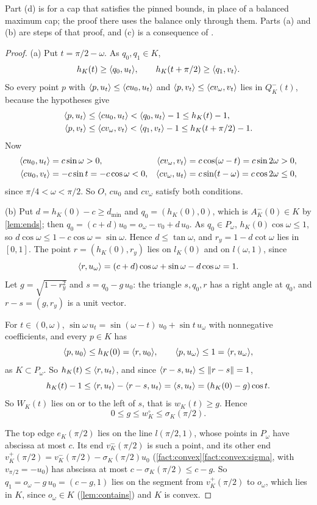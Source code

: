 Part (d) is  for a cap that satisfies the pinned bounds, in
place of a balanced maximum cap; the proof there uses the balance only through
them. Parts (a) and (b) are steps of that proof, and (c) is a consequence of
.

\begin{proof}
(a) Put $t=\pi/2-\omega$. As $q_0,q_1\in K$,
\[
  h_K(t)\ge\langle q_0,u_t\rangle,\qquad h_K(t+\pi/2)\ge\langle q_1,v_t\rangle.
\]
So every point $p$ with $\langle p,u_t\rangle\le\langle cu_0,u_t\rangle$ and $\langle p,v_t\rangle\le\langle cv_\omega,v_t\rangle$ lies in $Q^-_K(t)$, because the hypotheses give
\begin{align*}
  \langle p,u_t\rangle&\le\langle cu_0,u_t\rangle<\langle q_0,u_t\rangle-1\le h_K(t)-1,\\
  \langle p,v_t\rangle&\le\langle cv_\omega,v_t\rangle<\langle q_1,v_t\rangle-1\le h_K(t+\pi/2)-1.
\end{align*}
Now
\begin{align*}
  \langle cu_0,u_t\rangle&=c\sin\omega>0, &
    \langle cv_\omega,v_t\rangle&=c\cos(\omega-t)=c\sin2\omega>0,\\
  \langle cu_0,v_t\rangle&=-c\sin t=-c\cos\omega<0, &
    \langle cv_\omega,u_t\rangle&=c\sin(t-\omega)=c\cos2\omega\le0,
\end{align*}
since $\pi/4<\omega<\pi/2$. So $O$, $cu_0$ and $cv_\omega$ satisfy both
conditions.

(b) Put $d=h_K(0)-c\ge d_{\min}$ and $q_0=(h_K(0),0)$, which is $A^-_K(0)\in K$
by \cref{lem:ends}; then $q_0=(c+d)u_0=o_\omega-v_0+d\,u_0$. As $q_0\in
P_\omega$, $h_K(0)\cos\omega\le1$, so $d\cos\omega\le1-c\cos\omega=\sin\omega$.
Hence $d\le\tan\omega$, and $r_y=1-d\cot\omega$ lies in $[0,1]$. The point
$r=(h_K(0),r_y)$ lies on $l_K(0)$ and on $l(\omega,1)$, since
\[
  \langle r,u_\omega\rangle=(c+d)\cos\omega+\sin\omega-d\cos\omega=1.
\]
Let $g=\sqrt{1-r_y^2}$ and $s=q_0-g\,u_0$: the triangle $s,q_0,r$ has a right
angle at $q_0$, and $r-s=(g,r_y)$ is a unit vector.

For $t\in(0,\omega)$, $\sin\omega\,u_t=\sin(\omega-t)\,u_0+\sin t\,u_\omega$
with nonnegative coefficients, and every $p\in K$ has
\[
  \langle p,u_0\rangle\le h_K(0)=\langle r,u_0\rangle,\qquad\langle p,u_\omega\rangle\le1=\langle r,u_\omega\rangle,
\]
as $K\subset P_\omega$. So $h_K(t)\le\langle r,u_t\rangle$, and since
$\langle r-s,u_t\rangle\le\lVert r-s\rVert=1$,
\[
  h_K(t)-1\le\langle r,u_t\rangle-\langle r-s,u_t\rangle=\langle s,u_t\rangle=(h_K(0)-g)\cos t .
\]
So $W_K(t)$ lies on or to the left of $s$, that is $w_K(t)\ge g$. Hence
\[
  0\le g\le w^\circ_K\le\sigma_K(\pi/2).
\]

The top edge $e_K(\pi/2)$ lies on the line $l(\pi/2,1)$, whose points in
$P_\omega$ have abscissa at most $c$. Its end $v^-_K(\pi/2)$ is such a point,
and its other end $v^+_K(\pi/2)=v^-_K(\pi/2)-\sigma_K(\pi/2)u_0$
(\cref{fact:convex}\ref{fact:convex:sigma}, with $v_{\pi/2}=-u_0$) has abscissa
at most $c-\sigma_K(\pi/2)\le c-g$. So $q_1=o_\omega-g\,u_0=(c-g,1)$ lies on the
segment from $v^+_K(\pi/2)$ to $o_\omega$, which lies in $K$, since $o_\omega\in
K$ (\cref{lem:contains}) and $K$ is convex.


\end{proof}
